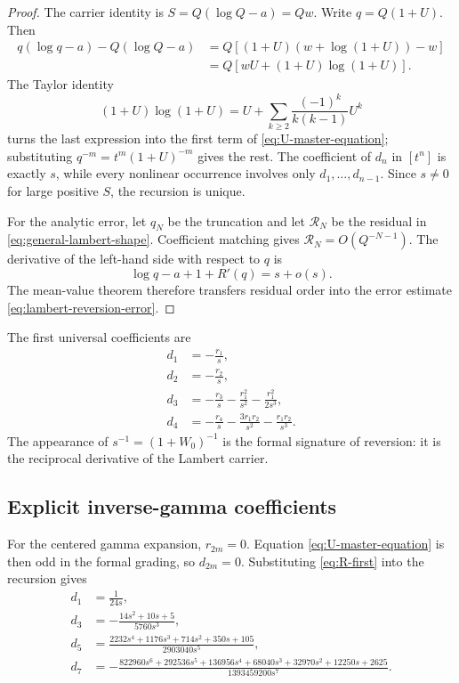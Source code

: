 \documentclass[11pt]{article}
\numberwithin{equation}{section}
\theoremstyle{mainthm}
\theoremstyle{defstyle}
\theoremstyle{remark}
\begin{document}
\begin{proof}
The carrier identity is \(S=Q(\log Q-a)=Qw\).  Write \(q=Q(1+U)\).  Then
\begin{align*}
 q(\log q-a)-Q(\log Q-a)
 &=Q\left[(1+U)(w+\log(1+U))-w\right]\\
 &=Q\left[wU+(1+U)\log(1+U)\right].
\end{align*}
The Taylor identity
\begin{equation}\label{eq:one-plus-U-log}
 (1+U)\log(1+U)
 =U+\sum_{k\ge2}\frac{(-1)^k}{k(k-1)}U^k
\end{equation}
turns the last expression into the first term of \cref{eq:U-master-equation}; substituting
\(
 q^{-m}=t^m(1+U)^{-m}
\)
gives the rest.  The coefficient of \(d_n\) in \([t^n]\) is exactly \(s\), while every nonlinear occurrence involves only \(d_1,\ldots,d_{n-1}\).  Since \(s\ne0\) for large positive \(S\), the recursion is unique.

For the analytic error, let \(q_N\) be the truncation and let \(\mathcal R_N\) be the residual in \cref{eq:general-lambert-shape}.  Coefficient matching gives \(\mathcal R_N=O(Q^{-N-1})\).  The derivative of the left-hand side with respect to \(q\) is
\[
 \log q-a+1+R'(q)=s+o(s).
\]
The mean-value theorem therefore transfers residual order into the error estimate \cref{eq:lambert-reversion-error}.
\end{proof}

The first universal coefficients are
\begin{align}
 d_1&=-\frac{r_1}{s},\label{eq:d1-general}\\
 d_2&=-\frac{r_2}{s},\label{eq:d2-general}\\
 d_3&=-\frac{r_3}{s}-\frac{r_1^2}{s^2}-\frac{r_1^2}{2s^3},\label{eq:d3-general}\\
 d_4&=-\frac{r_4}{s}-\frac{3r_1r_2}{s^2}-\frac{r_1r_2}{s^3}.
 \label{eq:d4-general}
\end{align}
The appearance of \(s^{-1}=(1+W_0)^{-1}\) is the formal signature of reversion: it is the reciprocal derivative of the Lambert carrier.

\subsection{Explicit inverse-gamma coefficients}

For the centered gamma expansion, \(r_{2m}=0\).  Equation \cref{eq:U-master-equation} is then odd in the formal grading, so \(d_{2m}=0\).  Substituting \cref{eq:R-first} into the recursion gives
\begin{align}
 d_1&=\frac{1}{24s},\label{eq:gamma-d1}\\
 d_3&=-\frac{14s^2+10s+5}{5760s^3},\label{eq:gamma-d3}\\
 d_5&=\frac{2232s^4+1176s^3+714s^2+350s+105}{2903040s^5},\label{eq:gamma-d5}\\
 d_7&=-\frac{822960s^6+292536s^5+136956s^4+68040s^3
 +32970s^2+12250s+2625}{1393459200s^7}.
 \label{eq:gamma-d7}
\end{align}
\end{document}
